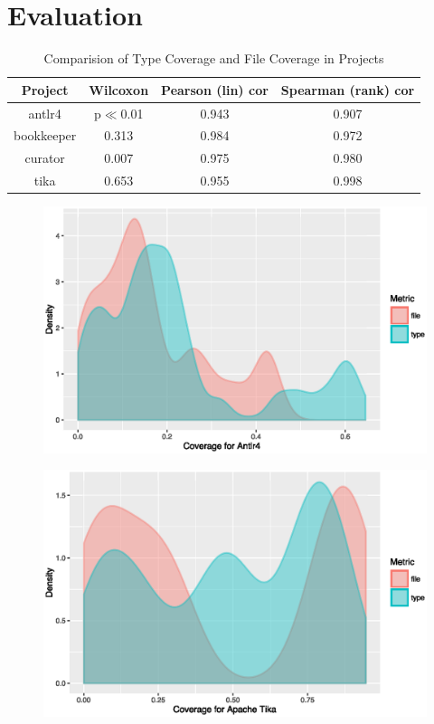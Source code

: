 \documentclass[conference]{IEEEtran}
\begin{document}
\section{Evaluation}

\begin{table}[!t]
\renewcommand{\arraystretch}{1.3}
\caption{Comparision of Type Coverage and File Coverage in Projects}
\label{tab:summary}
\centering
\begin{tabular}{c|ccc}
\hline
\bfseries Project & \bfseries Wilcoxon & \bfseries Pearson (lin) cor & \bfseries Spearman (rank) cor \\
\hline
antlr4 & p$\ll$0.01 & 0.943 & 0.907\\
bookkeeper & 0.313 & 0.984 & 0.972\\
curator & 0.007 & 0.975 & 0.980\\
tika & 0.653 & 0.955 & 0.998\\
\hline
\end{tabular}
\end{table}

\begin{figure}[!h]
\centering
\includegraphics[width=\columnwidth]{antlr-density}
\caption{}
\end{figure}

\begin{figure}[!h]
\centering
\includegraphics[width=\columnwidth]{tika-density}
\caption{}
\end{figure}
\end{document}
